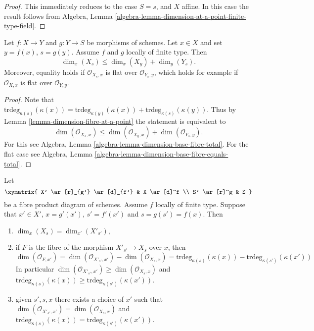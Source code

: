 \begin{proof}
This immediately reduces to the case $S = s$, and $X$ affine.
In this case the result follows from
Algebra, Lemma \ref{algebra-lemma-dimension-at-a-point-finite-type-field}.
\end{proof}

\begin{lemma}
\label{lemma-dimension-fibre-at-a-point-additive}
Let $f : X \to Y$ and $g : Y \to S$ be morphisms of schemes.
Let $x \in X$ and set $y = f(x)$, $s = g(y)$.
Assume $f$ and $g$ locally of finite type.
Then
$$
\dim_x(X_s) \leq \dim_x(X_y) + \dim_y(Y_s).
$$
Moreover, equality holds if $\mathcal{O}_{X_s, x}$ is flat
over $\mathcal{O}_{Y_s, y}$, which holds for example if $\mathcal{O}_{X, x}$
is flat over $\mathcal{O}_{Y, y}$.
\end{lemma}

\begin{proof}
Note that $\text{trdeg}_{\kappa(s)}(\kappa(x)) =
\text{trdeg}_{\kappa(y)}(\kappa(x)) + \text{trdeg}_{\kappa(s)}(\kappa(y))$.
Thus by Lemma \ref{lemma-dimension-fibre-at-a-point} the statement
is equivalent to
$$
\dim(\mathcal{O}_{X_s, x})
\leq
\dim(\mathcal{O}_{X_y, x}) + \dim(\mathcal{O}_{Y_s, y}).
$$
For this see Algebra, Lemma \ref{algebra-lemma-dimension-base-fibre-total}.
For the flat case see
Algebra, Lemma \ref{algebra-lemma-dimension-base-fibre-equals-total}.
\end{proof}

\begin{lemma}
\label{lemma-dimension-fibre-after-base-change}
Let
$$
\xymatrix{
X' \ar[r]_{g'} \ar[d]_{f'} & X \ar[d]^f \\
S' \ar[r]^g & S
}
$$
be a fibre product diagram of schemes. Assume $f$ locally of finite type.
Suppose that $x' \in X'$, $x = g'(x')$, $s' = f'(x')$ and
$s = g(s') = f(x)$. Then
\begin{enumerate}
\item $\dim_x(X_s) = \dim_{x'}(X'_{s'})$,
\item if $F$ is the fibre of the morphism $X'_{s'} \to X_s$
over $x$, then
$$
\dim(\mathcal{O}_{F, x'}) =
\dim(\mathcal{O}_{X'_{s'}, x'}) - \dim(\mathcal{O}_{X_s, x}) =
\text{trdeg}_{\kappa(s)}(\kappa(x)) -
\text{trdeg}_{\kappa(s')}(\kappa(x'))
$$
In particular $\dim(\mathcal{O}_{X'_{s'}, x'}) \geq \dim(\mathcal{O}_{X_s, x})$
and $\text{trdeg}_{\kappa(s)}(\kappa(x)) \geq
\text{trdeg}_{\kappa(s')}(\kappa(x'))$.
\item given $s', s, x$ there exists a choice of $x'$ such that
$\dim(\mathcal{O}_{X'_{s'}, x'}) = \dim(\mathcal{O}_{X_s, x})$ and
$\text{trdeg}_{\kappa(s)}(\kappa(x)) = \text{trdeg}_{\kappa(s')}(\kappa(x'))$.
\end{enumerate}
\end{lemma}


